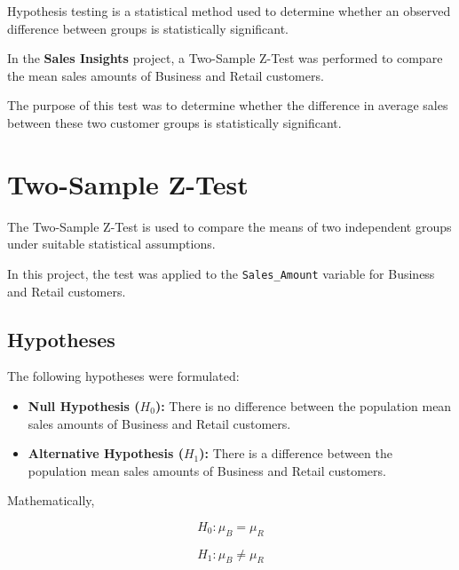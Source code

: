 \documentclass[12pt,a4paper]{report}
\begin{document}
\begingroup
\fontsize{14}{21}\selectfont

Hypothesis testing is a statistical method
used to determine whether an observed
difference between groups is statistically
significant.

In the \textbf{Sales Insights} project,
a Two-Sample Z-Test was performed to
compare the mean sales amounts of
Business and Retail customers.

The purpose of this test was to determine
whether the difference in average sales
between these two customer groups
is statistically significant.


\section{Two-Sample Z-Test}

The Two-Sample Z-Test is used to compare
the means of two independent groups
under suitable statistical assumptions.

In this project, the test was applied
to the \texttt{Sales\_Amount} variable
for Business and Retail customers.


\subsection{Hypotheses}

The following hypotheses were formulated:

\begin{itemize}

    \item \textbf{Null Hypothesis ($H_0$):}
    There is no difference between the
    population mean sales amounts of
    Business and Retail customers.

    \item \textbf{Alternative Hypothesis ($H_1$):}
    There is a difference between the
    population mean sales amounts of
    Business and Retail customers.

\end{itemize}

Mathematically,

\[
H_0: \mu_B = \mu_R
\]

\[
H_1: \mu_B \neq \mu_R
\]
\end{document}
